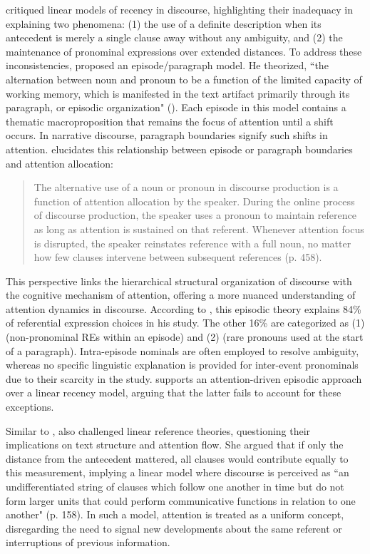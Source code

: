 \citet{Tomlin1987cognitive} critiqued linear models of recency in discourse, highlighting their inadequacy in explaining two phenomena: (1) the use of a definite description when its antecedent is merely a single clause away without any ambiguity, and (2) the maintenance of pronominal expressions over extended distances. To address these inconsistencies, \citeauthor{Tomlin1987cognitive} proposed an episode/paragraph model. He theorized, ``the alternation between noun and pronoun to be a function of the limited capacity of working memory, which is manifested in the text artifact primarily through its paragraph, or episodic organization" (\citeyear[456]{Tomlin1987cognitive}). Each episode in this model contains a thematic macroproposition that remains the focus of attention until a shift occurs. In narrative discourse, paragraph boundaries signify such shifts in attention. \citeauthor{Tomlin1987cognitive} elucidates this relationship between episode or paragraph boundaries and attention allocation:

\begin{quote}
	The alternative use of a noun or pronoun in discourse production is a function of attention allocation by the speaker. During the online process of discourse production, the speaker uses a pronoun to maintain reference as long as attention is sustained on that referent. Whenever attention focus is disrupted, the speaker reinstates reference with a full noun, no matter how few clauses intervene between subsequent references (p. 458).
\end{quote}

This perspective links the hierarchical structural organization of discourse with the cognitive mechanism of attention, offering a more nuanced understanding of attention dynamics in discourse. According to \citet{Tomlin1987cognitive}, this episodic theory explains 84\% of referential expression choices in his study. The other 16\% are categorized as (1)  (non-pronominal REs within an episode) and (2)  (rare pronouns used at the start of a paragraph). Intra-episode nominals are often employed to resolve ambiguity, whereas no specific linguistic explanation is provided for inter-event pronominals due to their scarcity in the study. \citeauthor{Tomlin1987cognitive} supports an attention-driven episodic approach over a linear recency model, arguing that the latter fails to account for these exceptions.

Similar to \citet{Tomlin1987cognitive}, \citet{fox1987anaphora} also challenged linear reference theories, questioning their implications on text structure and attention flow. She argued that if only the distance from the antecedent mattered, all clauses would contribute equally to this measurement, implying a linear model where discourse is perceived as ``an undifferentiated string of clauses which follow one another in time but do not form larger units that could perform communicative functions in relation to one another" (p. 158). In such a model, attention is treated as a uniform concept, disregarding the need to signal new developments about the same referent or interruptions of previous information.


